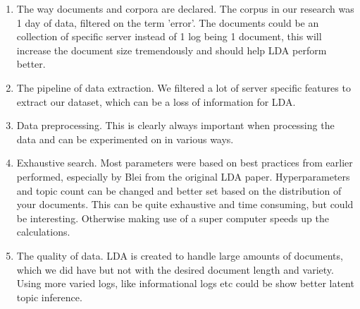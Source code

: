 \begin{enumerate}
    \item The way documents and corpora are declared. The corpus in our research was 1 day of data, filtered on the term 'error'. The documents could be an collection of specific server instead of 1 log being 1 document, this will increase the document size tremendously and should help LDA perform better.
    \item The pipeline of data extraction. We filtered a lot of server specific features to extract our dataset, which can be a loss of information for LDA. 
    \item Data preprocessing. This is clearly always important when processing the data and can be experimented on in various ways.
    \item Exhaustive search. Most parameters were based on best practices from earlier performed, especially by Blei from the original LDA paper. Hyperparameters and topic count can be changed and better set based on the distribution of your documents. This can be quite exhaustive and time consuming, but could be interesting. Otherwise making use of a super computer speeds up the calculations.
    \item The quality of data. LDA is created to handle large amounts of documents, which we did have but not with the desired document length and variety. Using more varied logs, like informational logs etc could be show better latent topic inference. 
\end{enumerate}
